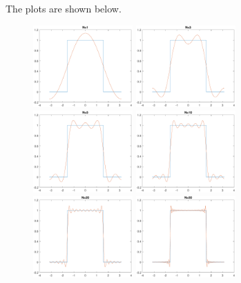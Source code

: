 \documentclass[12pt]{article}
\begin{document}
The plots are shown below.
\begin{figure}[H]
    \begin{center}
        \includegraphics[width=1.5in]{problem4c-1.pdf}
        \includegraphics[width=1.5in]{problem4c-3.pdf}
        \includegraphics[width=1.5in]{problem4c-5.pdf}
        \includegraphics[width=1.5in]{problem4c-10.pdf}
        \includegraphics[width=1.5in]{problem4c-20.pdf}
        \includegraphics[width=1.5in]{problem4c-50.pdf}
    \end{center}
\end{figure}
\end{document}
